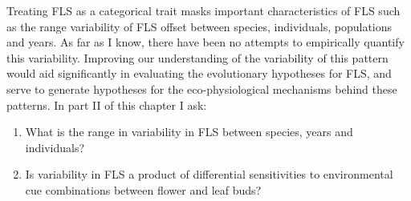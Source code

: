 \documentclass{article}\usepackage[]{graphicx}\usepackage[]{color}
\begin{document}
\indent\indent Treating FLS as a categorical trait masks important characteristics of FLS such as the range variability of FLS offset between species, individuals, populations and years. As far as I know, there have been no attempts to empirically quantify this variability. Improving our understanding of the variability of this pattern would aid significantly in evaluating the evolutionary hypotheses for FLS, and serve to generate hypotheses for the eco-physiological mechanisms behind these patterns. In part II of this chapter I ask:
\begin{enumerate}
\item What is the range in variability in FLS between species, years and individuals?
\item Is variability in FLS a product of differential sensitivities to environmental cue combinations between flower and leaf buds?
\end{enumerate}
\end{document}
